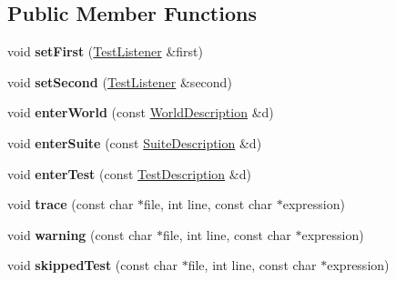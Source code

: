 \subsection*{Public Member Functions}
\begin{DoxyCompactItemize}
\item 
\hypertarget{classCxxTest_1_1TeeListener_aa91dcb312fe21c395f1eb4cb488b0316}{void {\bfseries set\-First} (\hyperlink{classCxxTest_1_1TestListener}{Test\-Listener} \&first)}\label{classCxxTest_1_1TeeListener_aa91dcb312fe21c395f1eb4cb488b0316}

\item 
\hypertarget{classCxxTest_1_1TeeListener_afde9102d8c0d6080dd2a10bb252c802d}{void {\bfseries set\-Second} (\hyperlink{classCxxTest_1_1TestListener}{Test\-Listener} \&second)}\label{classCxxTest_1_1TeeListener_afde9102d8c0d6080dd2a10bb252c802d}

\item 
\hypertarget{classCxxTest_1_1TeeListener_ad5700c6452a09529bcdcac7ae566e039}{void {\bfseries enter\-World} (const \hyperlink{classCxxTest_1_1WorldDescription}{World\-Description} \&d)}\label{classCxxTest_1_1TeeListener_ad5700c6452a09529bcdcac7ae566e039}

\item 
\hypertarget{classCxxTest_1_1TeeListener_ac65623839949cc08dc8641b880267619}{void {\bfseries enter\-Suite} (const \hyperlink{classCxxTest_1_1SuiteDescription}{Suite\-Description} \&d)}\label{classCxxTest_1_1TeeListener_ac65623839949cc08dc8641b880267619}

\item 
\hypertarget{classCxxTest_1_1TeeListener_a40cf28118bcd40ced4d6dfab8e33cc7e}{void {\bfseries enter\-Test} (const \hyperlink{classCxxTest_1_1TestDescription}{Test\-Description} \&d)}\label{classCxxTest_1_1TeeListener_a40cf28118bcd40ced4d6dfab8e33cc7e}

\item 
\hypertarget{classCxxTest_1_1TeeListener_a80dacd7cfae36046c8df4688a228c17b}{void {\bfseries trace} (const char $\ast$file, int line, const char $\ast$expression)}\label{classCxxTest_1_1TeeListener_a80dacd7cfae36046c8df4688a228c17b}

\item 
\hypertarget{classCxxTest_1_1TeeListener_ac2dcf6c878f03e19575a1b26f2a3730c}{void {\bfseries warning} (const char $\ast$file, int line, const char $\ast$expression)}\label{classCxxTest_1_1TeeListener_ac2dcf6c878f03e19575a1b26f2a3730c}

\item 
\hypertarget{classCxxTest_1_1TeeListener_af4e3de70e064d248b56322899af2fdf4}{void {\bfseries skipped\-Test} (const char $\ast$file, int line, const char $\ast$expression)}\label{classCxxTest_1_1TeeListener_af4e3de70e064d248b56322899af2fdf4}


\end{DoxyCompactItemize}
